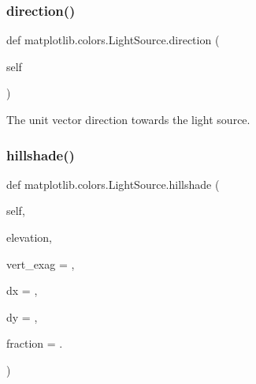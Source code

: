 \subsubsection{\texorpdfstring{direction()}{direction()}}
{\footnotesize\ttfamily def matplotlib.\+colors.\+Light\+Source.\+direction (\begin{DoxyParamCaption}\item[{}]{self }\end{DoxyParamCaption})}

\begin{DoxyVerb}The unit vector direction towards the light source.\end{DoxyVerb}
 \mbox{\label{classmatplotlib_1_1colors_1_1LightSource_a5e4963ea3c81293011cd6a1fb337f1f8}} 
\subsubsection{\texorpdfstring{hillshade()}{hillshade()}}
{\footnotesize\ttfamily def matplotlib.\+colors.\+Light\+Source.\+hillshade (\begin{DoxyParamCaption}\item[{}]{self,  }\item[{}]{elevation,  }\item[{}]{vert\+\_\+exag = {},  }\item[{}]{dx = {},  }\item[{}]{dy = {},  }\item[{}]{fraction = {.} }\end{DoxyParamCaption})}

